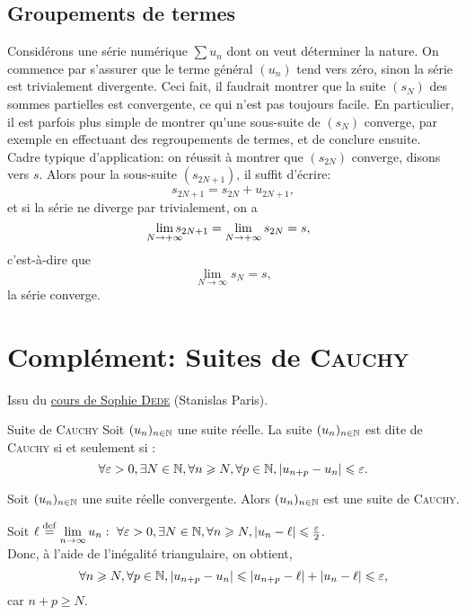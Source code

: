 \subsection{Groupements de termes}

Considérons une série numérique $\sum u_n$ dont on veut déterminer la nature. On commence par s'assurer que le terme général $(u_n)$ tend vers zéro, sinon la série est trivialement divergente. Ceci fait, il faudrait montrer que la suite $(s_N)$ des sommes partielles est convergente, ce qui n'est pas toujours facile. En particulier, il est parfois plus simple de montrer qu'une sous-suite de $(s_N)$ converge, par exemple en effectuant des regroupements de termes, et de conclure ensuite. \\
Cadre typique d'application: on réussit à montrer que $(s_{2N})$ converge, disons vers $s$. Alors pour la sous-suite $(s_{2N+1})$, il suffit d'écrire:
$$s_{2N+1} = s_{2N} + u_{2N+1},$$
et si la série ne diverge par trivialement, on a
$$\smashoperator{\lim_{N \to + \infty}} s_{2N+1} = \lim_{N \to + \infty} s_{2N} = s,$$
c'est-à-dire que 
$$\lim_{N \to \infty} s_N = s,$$
la série converge. 

\section{Complément: Suites de \textsc{Cauchy}}

Issu du \href{https://sophiedede.wordpress.com/}{cours de Sophie \textsc{Dede}} (Stanislas Paris). \\
\begin{defi}{Suite de \textsc{Cauchy}}
    Soit $(u_n)_{n \in \mathbb{N}}$ une suite réelle. La suite $(u_n)_{n \in \mathbb{N}}$ est dite de \textsc{Cauchy} si et seulement si :
    $$\forall \varepsilon > 0, \exists N \in \mathbb{N}, \forall n \geqslant N, \forall p \in \mathbb{N}, |u_{n+p} - u_n| \leqslant \varepsilon.$$
\end{defi}

\begin{prop}{}
    Soit $(u_n)_{n \in \mathbb{N}}$ une suite réelle convergente. Alors  $(u_n)_{n \in \mathbb{N}}$ est une suite de \textsc{Cauchy}.
\end{prop}

\begin{preuve}
    Soit $\ell \overset{\mathrm{\tiny def}}{=} \lim\limits_{n \to \infty} u_n:\ \forall \varepsilon > 0, \exists N \in \mathbb{N}, \forall n \geqslant N, |u_n - \ell| \leqslant \frac{\varepsilon}{2}$. \\
    Donc, à l'aide de l'inégalité triangulaire, on obtient,
    $$\forall n \geqslant N, \forall p \in \mathbb{N}, |u_{n+p} - u_n| \leqslant |u_{n+p} - \ell| + |u_n - \ell| \leqslant \varepsilon,$$
    car $n + p \geqslant N$.
\end{preuve}

